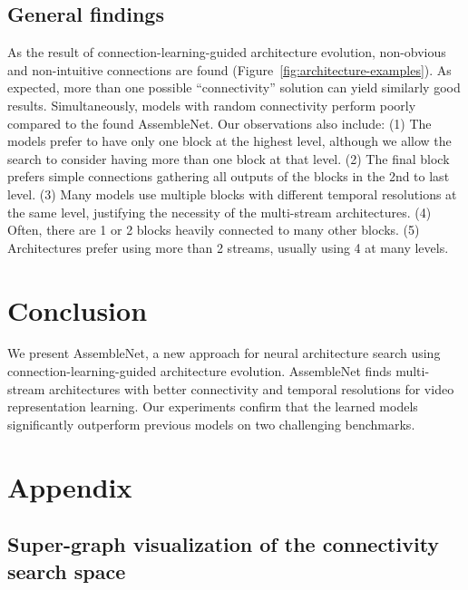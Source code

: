 \documentclass{article} \usepackage{iclr2020_conference,times}
\begin{document}
\vspace{-5pt}
\subsection{General findings}
\vspace{-5pt}

As the result of connection-learning-guided architecture evolution, non-obvious and non-intuitive connections are found (Figure~\ref{fig:architecture-examples}). As expected, more than one possible ``connectivity'' solution can yield similarly good results. Simultaneously, models with random connectivity perform poorly compared to the found AssembleNet. Our observations also include: (1) The models prefer to have only one block at the highest level, although we allow the search to consider having more than one block at that level. (2)  The final block prefers simple connections gathering all outputs of the blocks in the 2nd to last level. (3) Many models use multiple blocks with different temporal resolutions at the same level, justifying the necessity of the multi-stream architectures. (4) Often, there are 1 or 2 blocks heavily connected to many other blocks. (5) Architectures prefer using more than 2 streams, usually using 4 at many levels.




\section{Conclusion}

We present AssembleNet, a new approach for neural architecture search using connection-learning-guided architecture evolution. AssembleNet finds multi-stream architectures with better connectivity and temporal resolutions for video representation learning. Our experiments confirm that the learned models significantly outperform previous models on two challenging benchmarks. 




\newpage
\appendix
\section{Appendix}


\subsection{Super-graph visualization of the connectivity search space}
\end{document}

